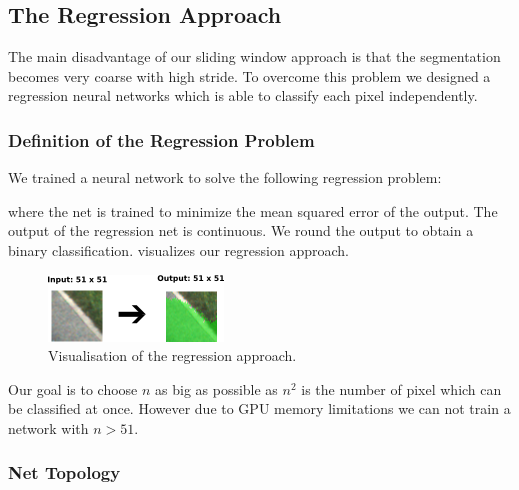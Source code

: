 \subsection{The Regression Approach}

The main disadvantage of our sliding window approach is that the segmentation becomes very coarse with high stride. To overcome this problem we designed a regression neural networks which is able to classify each pixel independently.

\subsubsection{Definition of the Regression Problem}

We trained a neural network to solve the following regression problem:


where the net is trained to minimize the mean squared error of the output. The output of the regression net is continuous. We round the output to obtain a binary classification.   visualizes our regression approach.

\begin{figure}[H]
	\centering
	\includegraphics[width=0.5\columnwidth]{figures/models/fully-conv.png}
	\caption{Visualisation of the regression approach.}
	\label{fig:reg}
\end{figure}

Our goal is to choose $n$ as big as possible as $n^2$ is the number of pixel which can be classified at once. However due to GPU memory limitations we can not train a network with $n > 51$.





\subsubsection{Net Topology}

